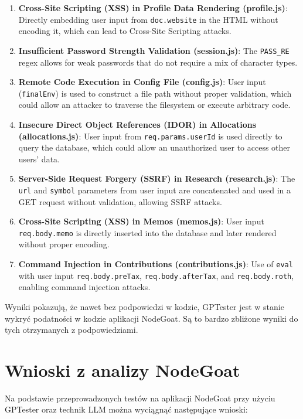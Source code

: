 \begin{enumerate}
    \item \textbf{Cross-Site Scripting (XSS) in Profile Data Rendering (profile.js)}: Directly embedding user input from \texttt{doc.website} in the HTML without encoding it, which can lead to Cross-Site Scripting attacks.
    \item \textbf{Insufficient Password Strength Validation (session.js)}: The \texttt{PASS\_RE} regex allows for weak passwords that do not require a mix of character types.
    \item \textbf{Remote Code Execution in Config File (config.js)}: User input (\texttt{finalEnv}) is used to construct a file path without proper validation, which could allow an attacker to traverse the filesystem or execute arbitrary code.
    \item \textbf{Insecure Direct Object References (IDOR) in Allocations (allocations.js)}: User input from \texttt{req.params.userId} is used directly to query the database, which could allow an unauthorized user to access other users' data.
    \item \textbf{Server-Side Request Forgery (SSRF) in Research (research.js)}: The \texttt{url} and \texttt{symbol} parameters from user input are concatenated and used in a GET request without validation, allowing SSRF attacks.
    \item \textbf{Cross-Site Scripting (XSS) in Memos (memos.js)}: User input \texttt{req.body.memo} is directly inserted into the database and later rendered without proper encoding.
    \item \textbf{Command Injection in Contributions (contributions.js)}: Use of \texttt{eval} with user input \texttt{req.body.preTax}, \texttt{req.body.afterTax}, and \texttt{req.body.roth}, enabling command injection attacks.
\end{enumerate}

Wyniki pokazują, że nawet bez podpowiedzi w kodzie, GPTester jest w stanie wykryć podatności w kodzie aplikacji NodeGoat. Są to bardzo zbliżone wyniki do tych otrzymanych z podpowiedziami.  

\section{Wnioski z analizy NodeGoat}
\label{sec:wnioski}

Na podstawie przeprowadzonych testów na aplikacji NodeGoat przy użyciu GPTester oraz technik LLM można wyciągnąć następujące wnioski:

